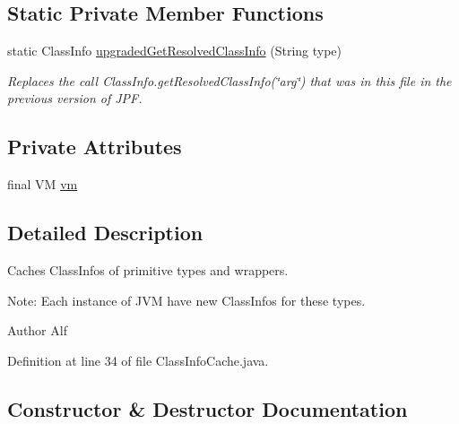 \subsection*{Static Private Member Functions}
\begin{DoxyCompactItemize}
\item 
static Class\+Info \hyperlink{classgov_1_1nasa_1_1jpf_1_1inspector_1_1utils_1_1_class_info_cache_a021a51505701a1ad6c8abd0dbf507921}{upgraded\+Get\+Resolved\+Class\+Info} (String type)
\begin{DoxyCompactList}\small\item\em Replaces the call {\ttfamily Class\+Info.\+get\+Resolved\+Class\+Info(\char`\"{}arg\char`\"{})} that was in this file in the previous version of J\+PF. \end{DoxyCompactList}\end{DoxyCompactItemize}
\subsection*{Private Attributes}
\begin{DoxyCompactItemize}
\item 
final VM \hyperlink{classgov_1_1nasa_1_1jpf_1_1inspector_1_1utils_1_1_class_info_cache_a4d8d22b70b147daca18b19bff668882b}{vm}
\end{DoxyCompactItemize}


\subsection{Detailed Description}
Caches Class\+Infos of primitive types and wrappers. 

Note\+: Each instance of J\+VM have new Class\+Infos for these types.

\begin{DoxyAuthor}{Author}
Alf 
\end{DoxyAuthor}


Definition at line 34 of file Class\+Info\+Cache.\+java.



\subsection{Constructor \& Destructor Documentation}
